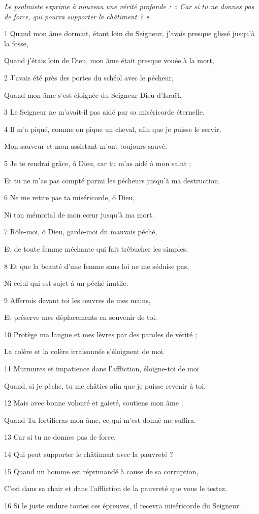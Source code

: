 
\par \textit{Le psalmiste exprime à nouveau une vérité profonde : « Car si tu ne donnes pas de force, qui pourra supporter le châtiment ? »}

\par 1 Quand mon âme dormait, étant loin du Seigneur, j'avais presque glissé jusqu'à la fosse,
\par     Quand j'étais loin de Dieu, mon âme était presque vouée à la mort,
\par 2 J'avais été près des portes du schéol avec le pécheur,
\par     Quand mon âme s'est éloignée du Seigneur Dieu d'Israël,
\par 3 Le Seigneur ne m'avait-il pas aidé par sa miséricorde éternelle.
\par   
\par 4 Il m'a piqué, comme on pique un cheval, afin que je puisse le servir,
\par     Mon sauveur et mon assistant m'ont toujours sauvé.
\par 5 Je te rendrai grâce, ô Dieu, car tu m'as aidé à mon salut ;
\par     Et tu ne m'as pas compté parmi les pécheurs jusqu'à ma destruction.
\par 6 Ne me retire pas ta miséricorde, ô Dieu,
\par     Ni ton mémorial de mon cœur jusqu'à ma mort.
\par 7 Rôle-moi, ô Dieu, garde-moi du mauvais péché,
\par     Et de toute femme méchante qui fait trébucher les simples.
\par 8 Et que la beauté d'une femme sans loi ne me séduise pas,
\par     Ni celui qui est sujet à un péché inutile.
\par   
\par 9 Affermis devant toi les œuvres de mes mains,
\par     Et préserve mes déplacements en souvenir de toi.
\par 10 Protège ma langue et mes lèvres par des paroles de vérité ;
\par     La colère et la colère irraisonnée s'éloignent de moi.
\par 11 Murmures et impatience dans l'affliction, éloigne-toi de moi
\par     Quand, si je pèche, tu me châties afin que je puisse revenir à toi.
\par 12 Mais avec bonne volonté et gaieté, soutiens mon âme ;
\par     Quand Tu fortifieras mon âme, ce qui m'est donné me suffira.
\par 13 Car si tu ne donnes pas de force,
\par 14 Qui peut supporter le châtiment avec la pauvreté ?
\par 15 Quand un homme est réprimandé à cause de sa corruption,
\par     C'est dans sa chair et dans l'affliction de la pauvreté que vous le testez.
\par 16 Si le juste endure toutes ces épreuves, il recevra miséricorde du Seigneur.

